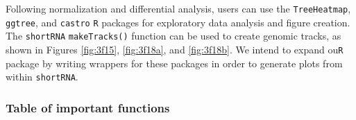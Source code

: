 \documentclass[12pt,twoside]{reedthesis}
\begin{document}
Following normalization and differential analysis, users can use the
\texttt{TreeHeatmap}, \texttt{ggtree}, and \texttt{castro} \texttt{R} packages for exploratory data analysis
and figure creation. The \texttt{shortRNA} \texttt{makeTracks()} function can be used to
create genomic tracks, as shown in Figures \ref{fig:3f15}, \ref{fig:3f18a}, and \ref{fig:3f18b}. We intend to
expand ou\texttt{R} package by writing wrappers for these packages in order to
generate plots from within \texttt{shortRNA}.

\hypertarget{table-of-important-functions}{%
\subsubsection{Table of important functions}\label{table-of-important-functions}}
\end{document}
